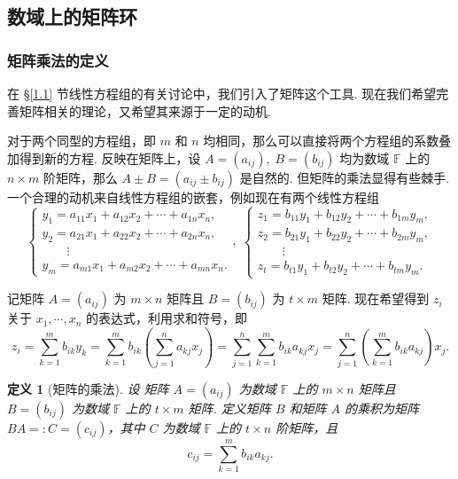\documentclass[10pt,openany]{article}
\theoremstyle{thmstyle} %
\theoremstyle{defstyle} %
\newtheorem{definition}[theorem]{定义}
\theoremstyle{prostyle} %
\theoremstyle{exastyle}
\theoremstyle{remstyle}
\newcommand{\F}{\mathbb{F}}
\begin{document}
\subsection{数域上的矩阵环}

\subsubsection{矩阵乘法的定义}

在 \S \ref{1.1} 节线性方程组的有关讨论中，我们引入了矩阵这个工具. 现在我们希望完善矩阵相关的理论，又希望其来源于一定的动机. 

对于两个同型的方程组，即 \( m \) 和 \( n \) 均相同，那么可以直接将两个方程组的系数叠加得到新的方程. 反映在矩阵上，设 \( A=(a_{ij}), \; B=(b_{ij}) \) 均为数域 \( \F \) 上的 \( n \times m \) 阶矩阵，那么 \( A \pm B=(a_{ij} \pm b_{ij}) \) 是自然的. 但矩阵的乘法显得有些棘手. 一个合理的动机来自线性方程组的嵌套，例如现在有两个线性方程组
\[ \left\{ \begin{array}{l}
	y_1= a_{11}x_1+a_{12}x_2+\cdots+a_{1n}x_n, \\
	y_2= a_{21}x_1+a_{22}x_2+\cdots+a_{2n}x_n, \\
	\qquad \vdots \\
	y_m= a_{m1}x_1+a_{m2}x_2+\cdots+a_{mn}x_n.
\end{array}\right. , \; \left\{ \begin{array}{l}
z_1= b_{11}y_1+b_{12}y_2+\cdots+b_{1m}y_m, \\
z_2= b_{21}y_1+b_{22}y_2+\cdots+b_{2m}y_m, \\
\qquad \vdots \\
z_t= b_{t1}y_1+b_{t2}y_2+\cdots+b_{tm}y_m.
\end{array}\right. \]

记矩阵 \( A=(a_{ij}) \) 为 \( m \times n \) 矩阵且 \( B=(b_{ij}) \) 为 \( t\times m \) 矩阵. 现在希望得到 \( z_i \) 关于 \( x_1,\cdots,x_n \) 的表达式，利用求和符号，即
\[ z_i=\sum_{k=1}^{m} b_{ik}y_k= \sum_{k=1}^{m} b_{ik} \left( \sum_{j=1}^{n} a_{kj} x_j \right)= \sum_{j=1}^{n} \sum_{k=1}^{m} b_{ik}a_{kj} x_j = \sum_{j=1}^{n} \left( \sum_{k=1}^{m} b_{ik}a_{kj}\right) x_j. \]

\begin{definition}[矩阵的乘法]	\label{1.3.1}
	设 矩阵 \( A=(a_{ij}) \) 为数域 \( \F \) 上的 \( m \times n \) 矩阵且 \( B=(b_{ij}) \) 为数域 \( \F \) 上的 \( t\times m \) 矩阵. 定义矩阵 \( B \) 和矩阵 \( A \) 的乘积为矩阵 \( BA=:C=(c_{ij}) \)，其中 \( C \) 为数域 \( \F \) 上的 \( t \times n \) 阶矩阵，且
	\[ c_{ij}=\sum_{k=1}^{m} b_{ik}a_{kj}. \] 

\end{definition}
\end{document}
